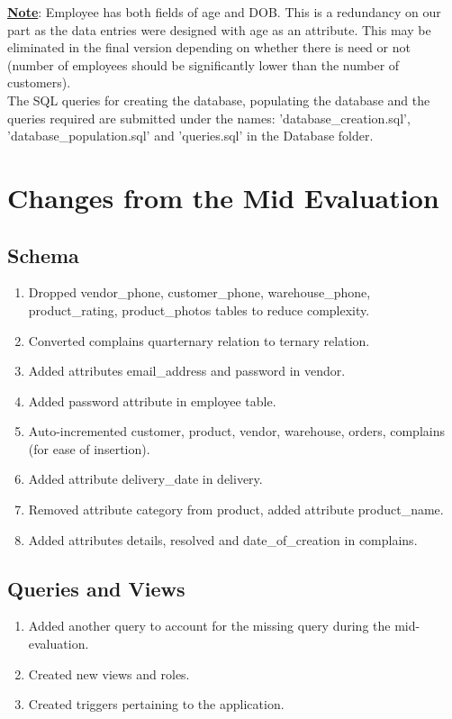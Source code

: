 \documentclass[12pt]{report}
\begin{document}
\textbf{\underline{ Note}}: Employee has both fields of age and DOB. This is a redundancy on our part as the data entries were designed with age as an attribute. This may be eliminated in the final version depending on whether there is need or not (number of employees should be significantly lower than the number of customers).
\\
The SQL queries for creating the database, populating the database and the queries required are submitted under the names: 'database\_creation.sql', 'database\_population.sql' and 'queries.sql' in the Database folder.

\chapter{Changes from the Mid Evaluation}


    \section*{Schema}
        \begin{enumerate}
            \item Dropped vendor\_phone, customer\_phone, warehouse\_phone, product\_rating, product\_photos tables to reduce complexity.
            \item Converted complains quarternary relation to ternary relation.
            \item Added attributes email\_address and password in vendor.
            \item Added password attribute in employee table.
            \item Auto-incremented customer, product, vendor, warehouse, orders, complains (for ease of insertion).
            \item Added attribute delivery\_date in delivery.
            \item Removed attribute category from product, added attribute product\_name.
            \item Added attributes details, resolved and date\_of\_creation in complains.
        \end{enumerate}

    \section*{Queries and Views}
        \begin{enumerate}
            \item Added another query to account for the missing query during the mid-evaluation.
            \item Created new views and roles.
            \item Created triggers pertaining to the application.
        \end{enumerate}
\end{document}
